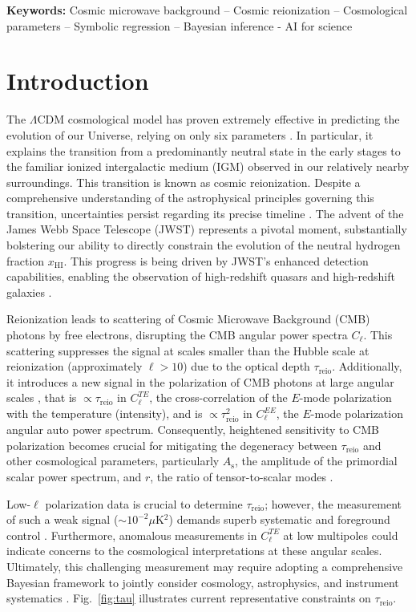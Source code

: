 \documentclass[12pt]{article}
\newcommand{\As}{A_\mathrm{s}}
\newcommand{\HI}{\mathrm{HI}}
\newcommand{\reio}{\mathrm{reio}}
\begin{document}
\textbf{Keywords:} Cosmic microwave background -- Cosmic reionization 
-- Cosmological parameters -- Symbolic regression -- Bayesian inference - AI for science

\section{Introduction}
The $\Lambda$CDM cosmological model has proven extremely effective in
predicting the evolution of our Universe, relying on only six parameters
\cite{Planck2020a}.
In particular, it explains the transition from a predominantly neutral
state in the early stages to the familiar ionized intergalactic medium
(IGM) observed in our relatively nearby surroundings.
This transition is known as cosmic reionization.
Despite a comprehensive understanding of the astrophysical principles
governing this transition, uncertainties persist regarding its precise
timeline \cite{Jin2023}.
The advent of the James Webb Space Telescope (JWST) \cite{Gardner2006}
represents a pivotal moment, substantially bolstering our ability to
directly constrain the evolution of the neutral hydrogen fraction
$x_\HI$.
This progress is being driven by JWST's enhanced detection capabilities,
enabling the observation of high-redshift quasars \cite{Eilers2023} and
high-redshift galaxies \cite{Adams2023, Bradley2023, Donnan2023,
Ning2024}.

Reionization leads to scattering of Cosmic Microwave Background (CMB)
photons by free electrons, disrupting the CMB angular power spectra
$C_\ell$.
This scattering suppresses the signal at scales smaller than the Hubble
scale at reionization (approximately $\ell>10$) \cite{Planck2020b} due
to the optical depth $\tau_\reio$.
Additionally, it introduces a new signal in the polarization of CMB
photons at large angular scales \cite{Planck2020a}, that is $\propto
\tau_\reio$ in $C^{TE}_\ell$, the cross-correlation of the $E$-mode
polarization with the temperature (intensity), and is $\propto
\tau_\reio^2$ in $C^{EE}_\ell$, the $E$-mode polarization angular auto
power spectrum.
Consequently, heightened sensitivity to CMB polarization becomes crucial
for mitigating the degeneracy between $\tau_\reio$ and other
cosmological parameters, particularly $\As$, the amplitude of the
primordial scalar power spectrum, and $r$, the ratio of tensor-to-scalar
modes \cite{Natale2020}.

Low-$\ell$ polarization data is crucial to determine $\tau_\reio$;
however, the measurement of such a weak signal ($\sim 10^{-2} \mu$K$^2$)
demands superb systematic and foreground control \cite{Planck2020b}.
Furthermore, anomalous measurements in $C^{TE}_\ell$ at low multipoles
\cite{Planck2020a} could indicate concerns to the cosmological
interpretations at these angular scales.
Ultimately, this challenging measurement may require adopting a
comprehensive Bayesian framework to jointly consider cosmology,
astrophysics, and instrument systematics \cite{Paradiso2023}.
Fig.~\ref{fig:tau} illustrates current representative constraints on
$\tau_\reio$.
\end{document}
